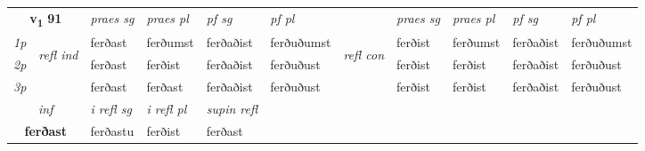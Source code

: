\noindent
\begin{tabular}{lllllllllll} \toprule
\multicolumn{2}{c}{\textbf{v{\textsubscript{1}}} \Large{\textbf{91}}}  &  \textit{praes sg}  & \textit{praes pl}  &\textit{ pf sg} & \textit{pf pl} &  &  \textit{praes sg}  & \textit{praes pl}  & \textit{pf sg} & \textit{pf pl } \\*
	\cmidrule{3-6} \cmidrule{8-11}
 {\textit{1p}} & \multirow{3}{*}{\begin{turn}{90}\textit{refl ind}\end{turn}}  & ferðast & ferðumst & ferðaðist & ferðuðumst & \multirow{3}{*}{\begin{turn}{90}\textit{refl con}\end{turn}}  &ferðist & ferðumst & ferðaðist & ferðuðumst \\*
 {\textit{2p}} &  & ferðast & ferðist & ferðaðist & ferðuðust & &ferðist & ferðist & ferðaðist & ferðuðust \\*
 {\textit{3p}}  & & ferðast & ferðast & ferðaðist & ferðuðust & & ferðist & ferðist& ferðaðist & ferðuðust \\*
\cmidrule{3-6} \cmidrule{8-11}

   \multicolumn{2}{c}{\textit{inf}}   & \textit{i refl sg} & \textit{i refl pl}   & \textit{supin refl}  \\*
  \multicolumn{2}{c}{\textbf{ferðast}}    & ferðastu & ferðist   & ferðast  \\*
\end{tabular}

